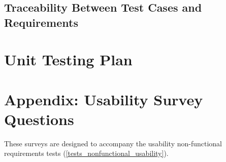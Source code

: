 \documentclass[12pt, titlepage]{article}
\begin{document}
%
%
%	
%	
%	
%	
%	
%	
%	
%
%
%	
%	
%	
%	
%	
%	
%	
%	
%	
%	
%	
%	
%	

\subsection{Traceability Between Test Cases and Requirements}

				
\section{Unit Testing Plan}
		

%

%

\newpage

\section{Appendix: Usability Survey Questions}
These surveys are designed to accompany the usability non-functional 
requirements tests (\ref{tests_nonfunctional_usability}).
\end{document}

